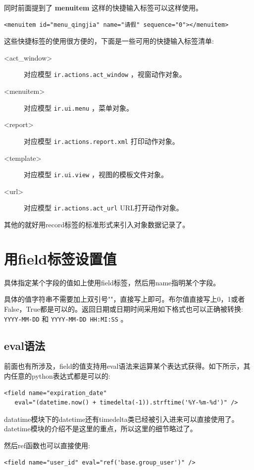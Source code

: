 \documentclass[11pt,a4paper]{sphinxmanual}
\begin{document}
同时前面提到了 \textbf{menuitem} 这样的快捷输入标签可以这样使用。
\begin{Verbatim}
<menuitem id="menu_qingjia" name="请假" sequence="0"></menuitem>
\end{Verbatim}

这些快捷标签的使用很方便的，下面是一些可用的快捷输入标签清单:

\begin{description}
\item[{<act\_window>}] 对应模型 \verb~ir.actions.act_window~ ，视窗动作对象。
\item[{<menuitem>}] 对应模型 \verb~ir.ui.menu~ ，菜单对象。
\item[{<report>}] 对应模型 \verb~ir.actions.report.xml~ 打印动作对象。
\item[{<template>}] 对应模型 \verb~ir.ui.view~ ，视图的模板文件对象。
\item[{<url>}] 对应模型 \verb~ir.actions.act_url~ URL打开动作对象。
\end{description}

其他的就好用record标签的标准形式来引入对象数据记录了。

\section{用field标签设置值}
\label{sec-9-5}
具体指定某个字段的值如上使用field标签，然后用name指明某个字段。

具体的值字符串不需要加上双引号""，直接写上即可。布尔值直接写上0，1或者False，True都是可以的。返回日期或日期时间采用如下格式也可以正确被转换: \verb~YYYY-MM-DD~ 和 \verb~YYYY-MM-DD HH:MI:SS~ 。

\subsection{eval语法}
\label{sec-9-5-1}
前面也有所涉及，field的值支持用eval语法来运算某个表达式获得。如下所示，其内任意的python表达式都是可以的:

\begin{Verbatim}
<field name="expiration_date"
   eval="(datetime.now() + timedelta(-1)).strftime('%Y-%m-%d')" />
\end{Verbatim}

datatime模块下的datetime还有timedelta类已经被引入进来可以直接使用了。datetime模块的介绍不是这里的重点，所以这里的细节略过了。

然后ref函数也可以直接使用:

\begin{Verbatim}
<field name="user_id" eval="ref('base.group_user')" />
\end{Verbatim}
\end{document}
